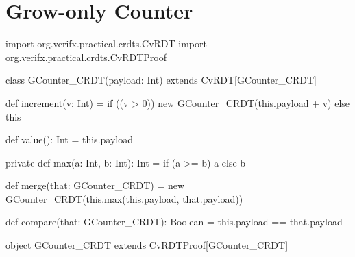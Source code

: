 
%

\chapter{Grow-only Counter}
\label{app:grow_counter}

\begin{Scala}
import org.verifx.practical.crdts.CvRDT
import org.verifx.practical.crdts.CvRDTProof

class GCounter_CRDT(payload: Int) extends CvRDT[GCounter_CRDT] {

  def increment(v: Int) = {
    if ((v > 0)) {
      new GCounter_CRDT(this.payload + v)
    } else {
      this
    }
  }

  def value(): Int = {
    this.payload
  }

  private def max(a: Int, b: Int): Int = {
    if (a >= b) a else b
  }

  def merge(that: GCounter_CRDT) = {
    new GCounter_CRDT(this.max(this.payload, that.payload))
  }

  def compare(that: GCounter_CRDT): Boolean = {
    this.payload == that.payload
  }

}

object GCounter_CRDT extends CvRDTProof[GCounter_CRDT]
\end{Scala}
